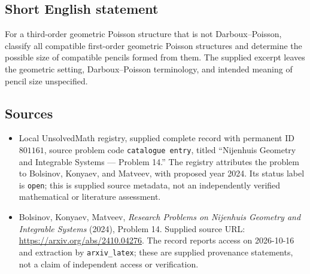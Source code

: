 \documentclass[11pt]{article}
\begin{document}
\subsection{Short English statement}
For a third-order geometric Poisson structure that is not Darboux--Poisson, classify all compatible first-order geometric Poisson structures and determine the possible size of compatible pencils formed from them. The supplied excerpt leaves the geometric setting, Darboux--Poisson terminology, and intended meaning of pencil size unspecified.
\subsection{Sources}
\begin{itemize}
\item Local UnsolvedMath registry, supplied complete record with permanent ID \(801161\), source problem code \texttt{catalogue entry}, titled ``Nijenhuis Geometry and Integrable Systems --- Problem 14.'' The registry attributes the problem to Bolsinov, Konyaev, and Matveev, with proposed year 2024. Its status label is \texttt{open}; this is supplied source metadata, not an independently verified mathematical or literature assessment.
\item Bolsinov, Konyaev, Matveev, \emph{Research Problems on Nijenhuis Geometry and Integrable Systems} (2024), Problem 14. Supplied source URL: \url{https://arxiv.org/abs/2410.04276}. The record reports access on 2026-10-16 and extraction by \texttt{arxiv\_latex}; these are supplied provenance statements, not a claim of independent access or verification.
\end{itemize}
\end{document}
